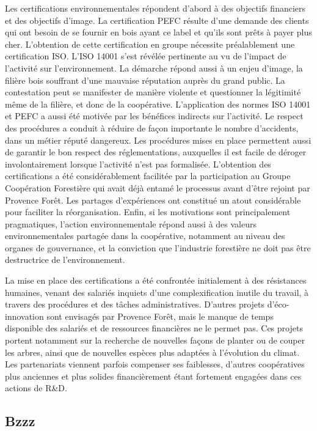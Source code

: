        Les certifications environnementales répondent d’abord à des objectifs financiers et des objectifs d’image. La certification PEFC résulte d’une demande des clients qui ont besoin de se fournir en bois ayant ce label et qu’ils sont prêts à payer plus cher. L’obtention de cette certification en groupe nécessite préalablement une certification ISO. L’ISO 14001 s’est révélée pertinente au vu de l’impact de l’activité sur l’environnement. La démarche répond aussi à un enjeu d’image, la filière bois souffrant d’une mauvaise réputation auprès du grand public. La contestation peut se manifester de manière violente et questionner la légitimité même de la filière, et donc de la coopérative. L’application des normes ISO 14001 et PEFC a aussi été motivée par les bénéfices indirects sur l’activité. Le respect des procédures a conduit à réduire de façon importante le nombre d’accidents, dans un métier réputé dangereux. Les procédures mises en place permettent aussi de garantir le bon respect des réglementations, auxquelles il est facile de déroger involontairement lorsque l’activité n’est pas formalisée. L’obtention des certifications a été considérablement facilitée par la participation au Groupe Coopération Forestière qui avait déjà entamé le processus avant d’être rejoint par Provence Forêt. Les partages d’expériences ont constitué un atout considérable pour faciliter la réorganisation. Enfin, si les motivations sont principalement pragmatiques, l’action environnementale répond aussi à des valeurs environnementales partagée dans la coopérative, notamment au niveau des organes de gouvernance, et la conviction que l’industrie forestière ne doit pas être destructrice de l’environnement.

        La mise en place des certifications a été confrontée initialement à des résistances humaines, venant des salariés inquiets d’une complexification inutile du travail, à travers des procédures et des tâches administratives. D’autres projets d’éco-innovation sont envisagés par Provence Forêt, mais le manque de temps disponible des salariés et de ressources financières ne le permet pas. Ces projets portent notamment sur la recherche de nouvelles façons de planter ou de couper les arbres, ainsi que de nouvelles espèces plus adaptées à l’évolution du climat. Les partenariats viennent parfois compenser ses faiblesses, d’autres coopératives plus anciennes et plus solides financièrement étant fortement engagées dans ces actions de R\&D.

    \subsection{Bzzz}


